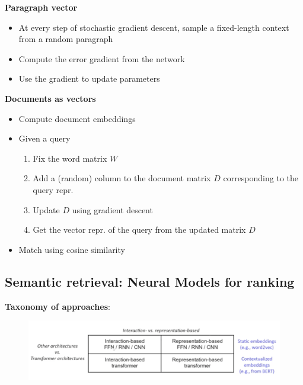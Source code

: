 \begin{enumerate}
\begin{itemize}
\begin{itemize}
            \begin{minipage}{0.32\textwidth}
            \textbf{Paragraph vector} 
            \begin{itemize}
                \setlength\itemsep{0em}
                \item At every step of stochastic gradient descent, sample a fixed-length context from a random paragraph
                \item Compute the error gradient from the network
                \item Use the gradient to update parameters
            \end{itemize}
            \end{minipage}
            \begin{minipage}{0.58\textwidth}
            \textbf{ \;\;\; Documents as vectors} 
            \begin{itemize}
                \setlength\itemsep{0em}
                \item Compute document embeddings
                \item Given a query
                \begin{enumerate}
                    \setlength\itemsep{0em}
                    \item Fix the word matrix $W$
                    \item Add a (random) column to the document matrix $D$ corresponding to the query repr.
                    \item Update $D$ using gradient descent
                    \item Get the vector repr. of the query from the updated matrix $D$
                \end{enumerate}
                \item Match using cosine similarity
            \end{itemize}
            \end{minipage}
        \end{itemize}
    \end{itemize}
\end{enumerate}

\newpage

\subsection{Semantic retrieval: Neural Models for ranking}

\textbf{Taxonomy of approaches}: 
\begin{figure}[ht!]
    \includegraphics[scale=0.75]{figures/taxonomy.png}
\end{figure}

